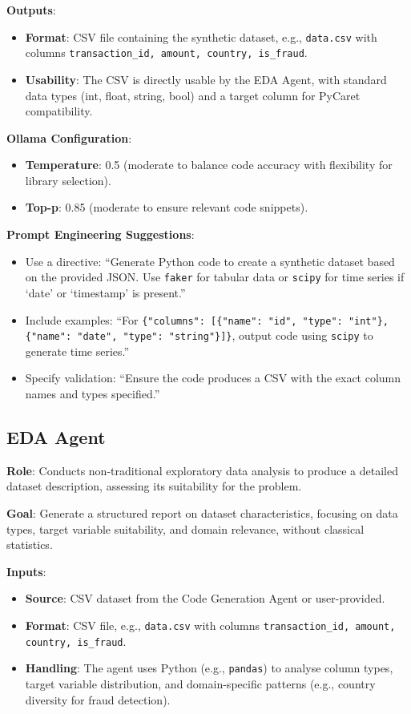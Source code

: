 \documentclass{article}
\begin{document}
\textbf{Outputs}:
\begin{itemize}[label=--]
    \item \textbf{Format}: CSV file containing the synthetic dataset, e.g., \texttt{data.csv} with columns \texttt{transaction\_id, amount, country, is\_fraud}.
    \item \textbf{Usability}: The CSV is directly usable by the EDA Agent, with standard data types (int, float, string, bool) and a target column for PyCaret compatibility.
\end{itemize}

\textbf{Ollama Configuration}:
\begin{itemize}[label=--]
    \item \textbf{Temperature}: 0.5 (moderate to balance code accuracy with flexibility for library selection).
    \item \textbf{Top-p}: 0.85 (moderate to ensure relevant code snippets).
\end{itemize}

\textbf{Prompt Engineering Suggestions}:
\begin{itemize}[label=--]
    \item Use a directive: “Generate Python code to create a synthetic dataset based on the provided JSON. Use \texttt{faker} for tabular data or \texttt{scipy} for time series if ‘date’ or ‘timestamp’ is present.”
    \item Include examples: “For \texttt{\{"columns": [\{"name": "id", "type": "int"\}, \{"name": "date", "type": "string"\}]\}}, output code using \texttt{scipy} to generate time series.”
    \item Specify validation: “Ensure the code produces a CSV with the exact column names and types specified.”
\end{itemize}

\subsection{EDA Agent}

\textbf{Role}: Conducts non-traditional exploratory data analysis to produce a detailed dataset description, assessing its suitability for the problem.

\textbf{Goal}: Generate a structured report on dataset characteristics, focusing on data types, target variable suitability, and domain relevance, without classical statistics.

\textbf{Inputs}:
\begin{itemize}[label=--]
    \item \textbf{Source}: CSV dataset from the Code Generation Agent or user-provided.
    \item \textbf{Format}: CSV file, e.g., \texttt{data.csv} with columns \texttt{transaction\_id, amount, country, is\_fraud}.
    \item \textbf{Handling}: The agent uses Python (e.g., \texttt{pandas}) to analyse column types, target variable distribution, and domain-specific patterns (e.g., country diversity for fraud detection).
\end{itemize}
\end{document}
